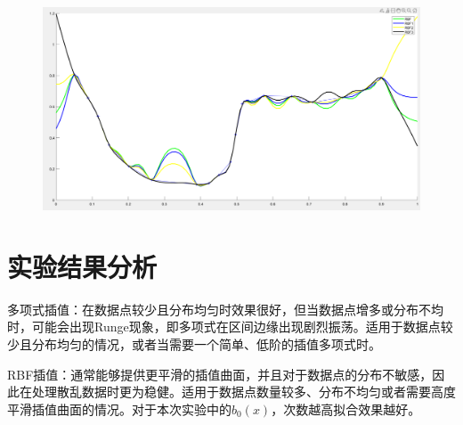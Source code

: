 \documentclass{article}
\begin{document}
\begin{figure}[H]
	\centering
	\includegraphics[scale=0.4]{result1}%
	\caption{}
	\label{fig:result1}
\end{figure}


	\section{实验结果分析}
	多项式插值：在数据点较少且分布均匀时效果很好，但当数据点增多或分布不均时，可能会出现Runge现象，即多项式在区间边缘出现剧烈振荡。适用于数据点较少且分布均匀的情况，或者当需要一个简单、低阶的插值多项式时。
	
	RBF插值：通常能够提供更平滑的插值曲面，并且对于数据点的分布不敏感，因此在处理散乱数据时更为稳健。适用于数据点数量较多、分布不均匀或者需要高度平滑插值曲面的情况。对于本次实验中的$b_0(x)$，次数越高拟合效果越好。
\end{document}
